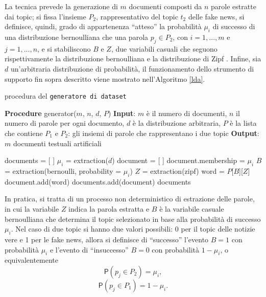 \documentclass[12pt]{report}
\theoremstyle{definition}
\begin{document}
La tecnica prevede la generazione di $m$ documenti composti da $n$ parole estratte dai topic; si fissa l'insieme $P_2$, rappresentativo del topic $t_2$ delle fake news, si definisce, quindi, grado di appartenenza ``atteso'' la probabilità $\mu_i$ di successo di una distribuzione bernoulliana che una parola $p_j \in P_2$, con $i=1, ..., m$ e $j=1, ..., n$, e si stabiliscono $B$ e $Z$, due variabili casuali che seguono rispettivamente la distribuzione bernoulliana e la distribuzione di Zipf \cite{34}. Infine, sia $d$ un'arbitraria distribuzione di probabilità, il funzionamento dello strumento di supporto fin sopra descritto viene mostrato nell'Algoritmo \ref{lda}.
\begin{algorithm}
\caption{procedura del \texttt{generatore di dataset}}
\label{lda}
\hspace*{\algorithmicindent} \textbf{Procedure} generator($m$, $n$, $d$, $P$)
\newline
\hspace*{\algorithmicindent} \textbf{Input}: $m$ è il numero di documenti, $n$ il numero di parole per ogni documento, $d$ è la distribuzione arbitraria, $P$ è la lista che contiene $P_1$ e $P_2$: gli insiemi di parole che rappresentano i due topic
\newline
\hspace*{\algorithmicindent} \textbf{Output}: $m$ documenti testuali artificiali
\begin{algorithmic}[1]
\STATE documents = [ ]
\STATE $\mu_i$ = extraction($d$)
\STATE document = [ ]
\STATE document.membership = $\mu_i$
\STATE $B$ = extraction(bernoulli, probability = $\mu_i$)
\STATE $Z$ = extraction(zipf)
\STATE word = $P$[$B$][$Z$]
\STATE document.add(word)
\ENDFOR
\STATE documents.add(document)
\ENDFOR
\RETURN documents
\end{algorithmic}
\end{algorithm}
In pratica, si tratta di un processo non deterministico di estrazione delle parole, in cui la variabile $Z$ indica la parola estratta e $B$ è la variabile casuale bernoulliana che determina il topic selezionato in base alla probabilità di successo $\mu_i$. Nel caso di due topic si hanno due valori possibili: 0 per il topic delle notizie vere e 1 per le fake news, allora si definisce di ``successo'' l'evento $B=1$ con probabilità $\mu_i$ e l'evento di ``insuccesso'' $B=0$ con probabilità $1-\mu_i$, o equivalentemente
\begin{equation}
    \mathsf{P}(p_j \in P_2) = \mu_i,
\end{equation}
\begin{equation}
    \mathsf{P}(p_j \in P_1) = 1 - \mu_i.
\end{equation}
\end{document}
